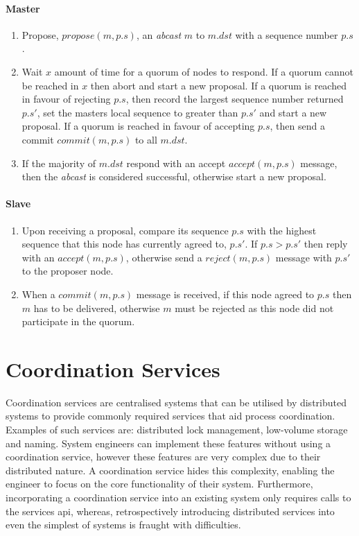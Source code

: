 		\paragraph{Master} \hspace{0pt}
		\begin{enumerate}
  			\item Propose, $propose(m, p.s)$, an \emph{abcast} $m$ to $m.dst$ with a sequence number $p.s$.
  			\item Wait $x$ amount of time for a quorum of nodes to respond.  If a quorum cannot be reached in $x$ then abort and start a new proposal.  If a quorum is reached in favour of rejecting $p.s$, then record the largest sequence number returned $p.s'$, set the masters local sequence to greater than $p.s'$ and start a new proposal.  If a quorum is reached in favour of accepting $p.s$, then send a commit $commit(m, p.s)$ to all $m.dst$.  
  			\item If the majority of $m.dst$ respond with an accept $accept(m, p.s)$ message, then the \emph{abcast} is considered successful, otherwise start a new proposal.  
		\end{enumerate}
		
		\paragraph{Slave} \hspace{0pt}
		\begin{enumerate}
  			\item Upon receiving a proposal, compare its sequence $p.s$ with the highest sequence that this node has currently agreed to, $p.s'$.  If $p.s > p.s'$ then reply with an $accept(m, p.s)$, otherwise send a $reject(m, p.s)$ message with $p.s'$ to the proposer node.  
  			\item When a $commit(m, p.s)$ message is received, if this node agreed to $p.s$ then $m$ has to be delivered, otherwise $m$ must be rejected as this node did not participate in the quorum.  
		\end{enumerate}		
	

\section{Coordination Services}\label{sec:coordination}
Coordination services are centralised systems that can be utilised by distributed systems to provide commonly required services that aid process coordination. Examples of such services are: distributed lock management, low-volume storage and naming. System engineers can implement these features without using a coordination service, however these features are very complex due to their distributed nature\citep{Burrows:2006:CLS:1298455.1298487}. A coordination service hides this complexity, enabling the engineer to focus on the core functionality of their system. Furthermore, incorporating a coordination service into an existing system only requires calls to the services api, whereas, retrospectively introducing distributed services into even the simplest of systems is fraught with difficulties. 

